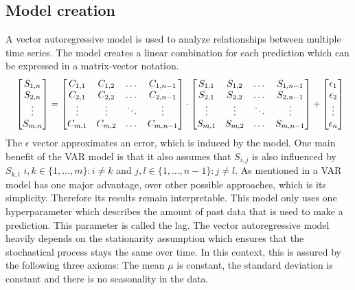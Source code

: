 \documentclass{article}
\theoremstyle{plain}
\theoremstyle{definition}
\theoremstyle{remark}
\begin{document}
\subsection{Model creation}\label{sec:methods:var}
A vector autoregressive model is used to analyze relationships between multiple time series.
The model creates a linear combination for each prediction which can be expressed in a matrix-vector notation.
\begin{equation*}
    \resizebox{\linewidth}{!}{
        $\begin{bmatrix}
            S_{1,n}\\
            S_{2,n}\\
            \vdots \\
            S_{m,n}
        \end{bmatrix} = 
        \begin{bmatrix}
            C_{1,1} & C_{1,2} & \dots &C_{1,n-1}\\
            C_{2,1} & C_{2,2} &\dots & C_{2,n-1}\\
            \vdots & \vdots  & \ddots &\vdots\\
            C_{m,1} & C_{m,2} &\dots &C_{m,n-1}\\
        \end{bmatrix} \cdot
        \begin{bmatrix}
            S_{1,1} & S_{1,2} & \dots & S_{1,n-1}\\
            S_{2,1} & S_{2,2} & \dots & S_{2,n-1}\\
            \vdots & \vdots  & \ddots &\vdots\\
            S_{m,1} & S_{m,2} & \dots & S_{m,n-1}\\
        \end{bmatrix}+
        \begin{bmatrix}
            \epsilon_{1}\\
            \epsilon_{2}\\
            \vdots\\
            \epsilon_{n}\\
        \end{bmatrix}$%
    }
\end{equation*}
The $\epsilon$ vector approximates an error, which is induced by the model. One main benefit of the VAR model is that it also assumes
that $S_{i,j}$ is also influenced by $S_{k,l}$ $i,k \in \{1,\dots, m\}: i\neq k$ and $j,l \in \{1,\dots, n-1\}: j\neq l$. As mentioned in \citep{var}
a VAR model has one major advantage, over other possible approaches, which is its simplicity. Therefore its results remain interpretable.
This model only uses one hyperparameter which describes the amount of past data that is used to make a prediction. This parameter is called the lag.
The vector autoregressive model heavily depends on the stationarity assumption which ensures that the stochastical process stays the same over time. 
In this context, this is assured by the following three axioms: The mean $\mu$ is constant, the standard deviation is constant
and there is no seasonality in the data.
\end{document}
